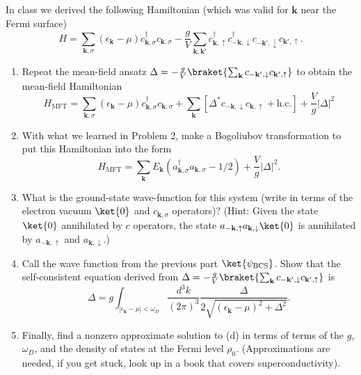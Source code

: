 \documentclass{jhwhw}
\begin{document}

In class we derived the following Hamiltonian (which was valid for $\mathbf k$ near the Fermi surface)
\begin{equation}
  \label{eq:4}
  H = \sum_{\mathbf k,\sigma} (\epsilon_{\mathbf k} - \mu)c_{\mathbf k,\sigma}^{\dagger} c_{\mathbf k,\sigma} - \frac{g}{V} \sum_{\mathbf k, \mathbf k'} c_{\mathbf k, \uparrow}^{\dagger} c_{-\mathbf k,\downarrow}^{\dagger} c_{-\mathbf k', \downarrow} c_{\mathbf k',\uparrow}.
\end{equation}


\begin{enumerate}
  \item Repeat the mean-field ansatz $\Delta = - \frac{g}{V} \braket{\sum_{\mathbf k}c_{-\mathbf k', \downarrow} c_{\mathbf k',\uparrow} }$ to obtain the mean-field Hamiltonian
        \begin{equation}
          \label{eq:6}
          H_{\mathrm{MFT}} = \sum_{\mathbf k,\sigma} (\epsilon_{\mathbf k} - \mu)c_{\mathbf k,\sigma}^{\dagger} c_{\mathbf k,\sigma}  + \sum_{\mathbf k} [\Delta^{*} c_{-\mathbf k, \downarrow} c_{\mathbf k,\uparrow} + \mathrm{h.c.}] + \frac{V}{g} |\Delta|^{2}
        \end{equation}
  \item With what we learned in Problem 2, make a Bogoliubov transformation to put this Hamiltonian into the form
        \begin{equation}
          \label{eq:7}
          H_{\mathrm{MFT}} = \sum_{\mathbf k} E_{\mathbf k} (a_{\mathbf k,\sigma}^{\dagger} a_{\mathbf k, \sigma} - 1/2) + \frac{V}{g} |\Delta|^{2}.
        \end{equation}
\item What is the ground-state wave-function for this system (write in terms of the electron vacuum $\ket{0}$ and $c_{\mathbf k,\sigma}$ operators)? (Hint: Given the state $\ket{0}$ annihilated by $c$ operators, the state $a_{-\mathbf k,\uparrow} a_{\mathbf k,\downarrow} \ket{0}$ is annihilated by $a_{-\mathbf k, \uparrow}$ and $a_{\mathbf k, \downarrow}$.)
  \item Call the wave function from the previous part $\ket{\psi_{\mathrm{BCS}}}$. Show that the self-consistent equation derived from $\Delta = - \frac{g}{V} \braket{\sum_{\mathbf k}c_{-\mathbf k', \downarrow} c_{\mathbf k',\uparrow} }$ is
        \begin{equation}
          \label{eq:8}
           \Delta = g \int_{|\epsilon_{\mathbf k} - \mu|<\omega_{D}} \frac{d^{3}k}{(2\pi)^{3}} \frac{\Delta}{2\sqrt{(\epsilon_{\mathbf k} - \mu)^{2} + \Delta^{2}}}.
        \end{equation}
  \item Finally, find a nonzero approximate solution to (d) in terms of terms of the $g$, $\omega_{D}$, and the density of states at the Fermi level $\rho_{0}$. (Approximations are needed, if you get stuck, look up in a book that covers superconductivity).
\end{enumerate}
\end{document}
